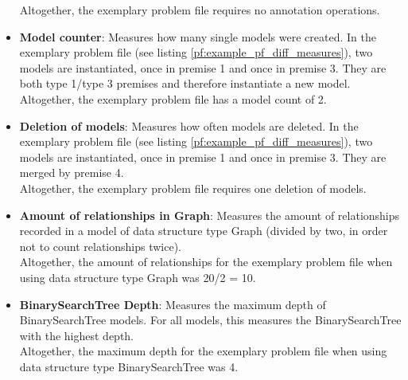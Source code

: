 \documentclass[hidelinks]{scrartcl}
\begin{document}
\begin{itemize}
	Altogether, the exemplary problem file requires no annotation operations.
	\item \textbf{Model counter}: Measures how many single models were created. In the exemplary problem file (see listing \ref{pf:example_pf_diff_measures}), two models are instantiated, once in premise 1 and once in premise 3. They are both type 1/type 3 premises and therefore instantiate a new model. \\
	Altogether, the exemplary problem file has a model count of 2.
	\item \textbf{Deletion of models}: Measures how often models are deleted. In the exemplary problem file (see listing \ref{pf:example_pf_diff_measures}), two models are instantiated, once in premise 1 and once in premise 3. They are merged by premise 4. \\
	Altogether, the exemplary problem file requires one deletion of models.
	\item \textbf{Amount of relationships in Graph}: Measures the amount of relationships recorded in a model of data structure type Graph (divided by two, in order not to count relationships twice). \\
	Altogether, the amount of relationships for the exemplary problem file when using data structure type Graph was 20/2 = 10.
	\item \textbf{BinarySearchTree Depth}: Measures the maximum depth of BinarySearchTree models. For all models, this measures the BinarySearchTree with the highest depth. \\
	Altogether, the maximum depth for the exemplary problem file when using data structure type BinarySearchTree was 4.
\end{itemize}
\end{document}
